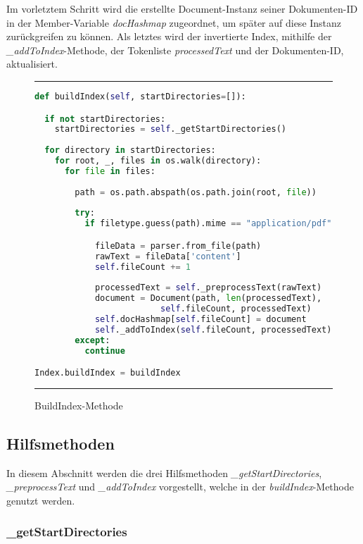 Im vorletztem Schritt wird die erstellte Document-Instanz seiner Dokumenten-ID in der Member-Variable \textit{docHashmap} zugeordnet, um später auf diese Instanz zurückgreifen zu können. Als letztes wird der invertierte Index, mithilfe der \textit{\_addToIndex}-Methode, der Tokenliste \textit{processedText} und der Dokumenten-ID, aktualisiert.

\begin{figure}
	\rule{\textwidth}{0.4pt}
		\begin{lstlisting}[language=Python]
def buildIndex(self, startDirectories=[]):

  if not startDirectories:
    startDirectories = self._getStartDirectories()
    
  for directory in startDirectories:
    for root, _, files in os.walk(directory):
      for file in files:
                
        path = os.path.abspath(os.path.join(root, file))
                
        try:
          if filetype.guess(path).mime == "application/pdf":

            fileData = parser.from_file(path)
            rawText = fileData['content']
            self.fileCount += 1
                    
            processedText = self._preprocessText(rawText)
            document = Document(path, len(processedText),
                         self.fileCount, processedText)
            self.docHashmap[self.fileCount] = document
            self._addToIndex(self.fileCount, processedText)
        except:
          continue

Index.buildIndex = buildIndex
		\end{lstlisting}
	\rule{\textwidth}{0.4pt}
	\caption{BuildIndex-Methode}
	\label{fig:build}
\end{figure}

\subsection{Hilfsmethoden}\label{hilfsmethoden}

In diesem Abschnitt werden die drei Hilfsmethoden \textit{\_getStartDirectories}, \textit{\_preprocessText} und \textit{\_addToIndex} vorgestellt, welche in der \textit{buildIndex}-Methode genutzt werden.

\subsubsection{\_getStartDirectories}

